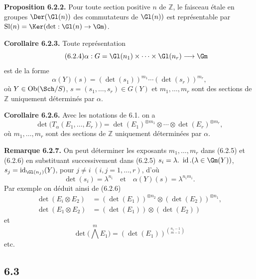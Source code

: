 \textbf{Proposition 6.2.2.} Pour toute section positive \(n\) de \(\mathbb Z\), le faisceau étale en groupes \(\Der(\Gl(n))\) des commutateurs de \(\Gl(n))\) est représentable par
\(\operatorname{Sl}(n)=\Ker(\det:\Gl(n)\to\Gm)\).

\textbf{Corollaire 6.2.3.} Toute représentation
\begin{equation}\tag{6.2.4}
 \alpha:G=\Gl(n_1)\times\cdots\times\Gl(n_r)\longrightarrow\Gm
\end{equation}
est de la forme
\begin{equation}\tag{6.2.5}
 \alpha(Y)(s)=(\det(s_1))^{m_1}\cdots(\det(s_r))^{m_r},
\end{equation}
où \(Y\in\operatorname{Ob}(\Sch/S)\), \(s=(s_1,\ldots,s_r)\in G(Y)\) et \(m_1,\ldots,m_r\) sont des sections de \(\mathbb Z\) uniquement déterminés par \(\alpha\).

\textbf{Corollaire 6.2.6.} Avec les notations de 6.1. on a
\begin{equation}\tag{6.2.6}
 \det\bigl(T_\alpha(E_1,\ldots,E_r)\bigr)
 =
 \det(E_1)^{\otimes m_1}\otimes\cdots\otimes
 \det(E_r)^{\otimes m_r},
\end{equation}
où \(m_1,\ldots,m_r\) sont des sections de \(\mathbb Z\) uniquement déterminées par \(\alpha\).

\textbf{Remarque 6.2.7.} On peut déterminer les exposants \(m_1,\ldots,m_r\) dans (6.2.5) et (6.2.6) en substituant successivement dans (6.2.5)
\(s_i=\lambda.\ \operatorname{id}.(\lambda\in\Gm(Y))\), \(s_j=\operatorname{id}_{\Gl(n_j)}(Y)\), pour \(j\ne i\) \((i,j=1,\ldots,r)\), d'où
\[
 \det(s_i)=\lambda^{n_i}\quad\text{et}\quad
 \alpha(Y)(s)=\lambda^{n_im_i}.
\]
Par exemple on déduit ainsi de (6.2.6)
\begin{align}
 \det(E_i\otimes E_2)&=(\det(E_1))^{\otimes n_2}\otimes(\det(E_2))^{\otimes n_1}, \tag{6.2.8}\\
 \det(E_1\otimes E_2)&=(\det(E_1))\otimes(\det(E_2)) \tag{6.2.9}
\end{align}
et
\begin{equation}\tag{6.2.10}
 \det\bigl(\bigwedge\limits^m E_1\bigr)=(\det(E_1))^{\binom{n_1-1}{m-1}}
\end{equation}
etc.

\subsection*{6.3}
